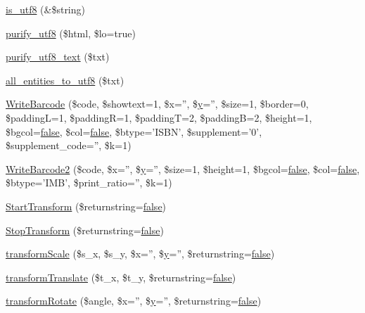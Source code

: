 \begin{DoxyCompactItemize}
\hyperlink{classm_p_d_f_a76545c94970dbfeb4375d526e907841d}{is\-\_\-utf8} (\&\$string)
\item 
\hyperlink{classm_p_d_f_af19d98f2c6c0f21f88ddc2765fca94ed}{purify\-\_\-utf8} (\$html, \$lo=true)
\item 
\hyperlink{classm_p_d_f_ab7e718af9e82d8a7b7ab95d8a8b8d308}{purify\-\_\-utf8\-\_\-text} (\$txt)
\item 
\hyperlink{classm_p_d_f_a8931af854a6be098e8f9ac5857139583}{all\-\_\-entities\-\_\-to\-\_\-utf8} (\$txt)
\item 
\hyperlink{classm_p_d_f_ac33a206681572b1f0d8b8c2093d619ca}{Write\-Barcode} (\$code, \$showtext=1, \$x='', \$\hyperlink{example43___m_p_d_f_i__booklet_8php_a3f83be162d14f38451e1bc419fbbbcbc}{y}='', \$size=1, \$border=0, \$padding\-L=1, \$padding\-R=1, \$padding\-T=2, \$padding\-B=2, \$height=1, \$bgcol=\hyperlink{ttfontsuni_8php_afbaa04e5cc97693dc668b3c45d3dd740}{false}, \$col=\hyperlink{ttfontsuni_8php_afbaa04e5cc97693dc668b3c45d3dd740}{false}, \$btype='I\-S\-B\-N', \$supplement='0', \$supplement\-\_\-code='', \$k=1)
\item 
\hyperlink{classm_p_d_f_a0faacf32ec5c1bae0b61e40da0a27ce3}{Write\-Barcode2} (\$code, \$x='', \$\hyperlink{example43___m_p_d_f_i__booklet_8php_a3f83be162d14f38451e1bc419fbbbcbc}{y}='', \$size=1, \$height=1, \$bgcol=\hyperlink{ttfontsuni_8php_afbaa04e5cc97693dc668b3c45d3dd740}{false}, \$col=\hyperlink{ttfontsuni_8php_afbaa04e5cc97693dc668b3c45d3dd740}{false}, \$btype='I\-M\-B', \$print\-\_\-ratio='', \$k=1)
\item 
\hyperlink{classm_p_d_f_adfdd2152210f63432ca7bee97c7d14d1}{Start\-Transform} (\$returnstring=\hyperlink{ttfontsuni_8php_afbaa04e5cc97693dc668b3c45d3dd740}{false})
\item 
\hyperlink{classm_p_d_f_a01b1acf689a356ac77f3c199255b954e}{Stop\-Transform} (\$returnstring=\hyperlink{ttfontsuni_8php_afbaa04e5cc97693dc668b3c45d3dd740}{false})
\item 
\hyperlink{classm_p_d_f_a0b980663da712ec3c6f0dac804b6d537}{transform\-Scale} (\$s\-\_\-x, \$s\-\_\-y, \$x='', \$\hyperlink{example43___m_p_d_f_i__booklet_8php_a3f83be162d14f38451e1bc419fbbbcbc}{y}='', \$returnstring=\hyperlink{ttfontsuni_8php_afbaa04e5cc97693dc668b3c45d3dd740}{false})
\item 
\hyperlink{classm_p_d_f_aacd630b85285d2bf4cad2731a920d353}{transform\-Translate} (\$t\-\_\-x, \$t\-\_\-y, \$returnstring=\hyperlink{ttfontsuni_8php_afbaa04e5cc97693dc668b3c45d3dd740}{false})
\item 
\hyperlink{classm_p_d_f_a2444155f29278de2eff23a28ad194522}{transform\-Rotate} (\$angle, \$x='', \$\hyperlink{example43___m_p_d_f_i__booklet_8php_a3f83be162d14f38451e1bc419fbbbcbc}{y}='', \$returnstring=\hyperlink{ttfontsuni_8php_afbaa04e5cc97693dc668b3c45d3dd740}{false})

\end{DoxyCompactItemize}

